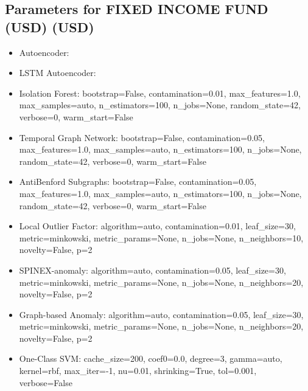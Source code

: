 \documentclass[11pt]{article}
\begin{document}
\subsection{Parameters for FIXED INCOME FUND (USD) (USD)}
\begin{itemize}

\item Autoencoder: 
\item LSTM Autoencoder: 
\item Isolation Forest: bootstrap=False, contamination=0.01, max_features=1.0, max_samples=auto, n_estimators=100, n_jobs=None, random_state=42, verbose=0, warm_start=False
\item Temporal Graph Network: bootstrap=False, contamination=0.05, max_features=1.0, max_samples=auto, n_estimators=100, n_jobs=None, random_state=42, verbose=0, warm_start=False
\item AntiBenford Subgraphs: bootstrap=False, contamination=0.05, max_features=1.0, max_samples=auto, n_estimators=100, n_jobs=None, random_state=42, verbose=0, warm_start=False
\item Local Outlier Factor: algorithm=auto, contamination=0.01, leaf_size=30, metric=minkowski, metric_params=None, n_jobs=None, n_neighbors=10, novelty=False, p=2
\item SPINEX-anomaly: algorithm=auto, contamination=0.05, leaf_size=30, metric=minkowski, metric_params=None, n_jobs=None, n_neighbors=20, novelty=False, p=2
\item Graph-based Anomaly: algorithm=auto, contamination=0.05, leaf_size=30, metric=minkowski, metric_params=None, n_jobs=None, n_neighbors=20, novelty=False, p=2
\item One-Class SVM: cache_size=200, coef0=0.0, degree=3, gamma=auto, kernel=rbf, max_iter=-1, nu=0.01, shrinking=True, tol=0.001, verbose=False
\end{itemize}
\end{document}

